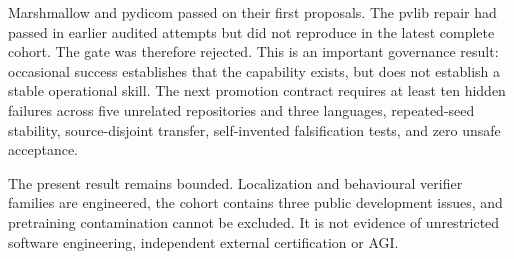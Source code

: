 Marshmallow and pydicom passed on their first proposals.  The pvlib repair had
passed in earlier audited attempts but did not reproduce in the latest complete
cohort.  The gate was therefore rejected.  This is an important governance
result: occasional success establishes that the capability exists, but does
not establish a stable operational skill.  The next promotion contract requires
at least ten hidden failures across five unrelated repositories and three
languages, repeated-seed stability, source-disjoint transfer, self-invented
falsification tests, and zero unsafe acceptance.

The present result remains bounded.  Localization and behavioural verifier
families are engineered, the cohort contains three public development issues,
and pretraining contamination cannot be excluded.  It is not evidence of
unrestricted software engineering, independent external certification or AGI.
